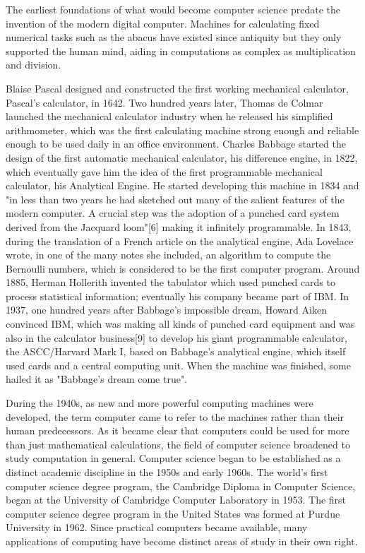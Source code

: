The earliest foundations of what would become computer science predate the invention of the modern digital computer. Machines for calculating fixed numerical tasks such as the abacus have existed since antiquity but they only supported the human mind, aiding in computations as complex as multiplication and division.

Blaise Pascal designed and constructed the first working mechanical calculator, Pascal's calculator, in 1642. Two hundred years later, Thomas de Colmar launched the mechanical calculator industry when he released his simplified arithmometer, which was the first calculating machine strong enough and reliable enough to be used daily in an office environment. Charles Babbage started the design of the first automatic mechanical calculator, his difference engine, in 1822, which eventually gave him the idea of the first programmable mechanical calculator, his Analytical Engine. He started developing this machine in 1834 and "in less than two years he had sketched out many of the salient features of the modern computer. A crucial step was the adoption of a punched card system derived from the Jacquard loom"[6] making it infinitely programmable. In 1843, during the translation of a French article on the analytical engine, Ada Lovelace wrote, in one of the many notes she included, an algorithm to compute the Bernoulli numbers, which is considered to be the first computer program. Around 1885, Herman Hollerith invented the tabulator which used punched cards to process statistical information; eventually his company became part of IBM. In 1937, one hundred years after Babbage's impossible dream, Howard Aiken convinced IBM, which was making all kinds of punched card equipment and was also in the calculator business[9] to develop his giant programmable calculator, the ASCC/Harvard Mark I, based on Babbage's analytical engine, which itself used cards and a central computing unit. When the machine was finished, some hailed it as "Babbage's dream come true".

During the 1940s, as new and more powerful computing machines were developed, the term computer came to refer to the machines rather than their human predecessors. As it became clear that computers could be used for more than just mathematical calculations, the field of computer science broadened to study computation in general. Computer science began to be established as a distinct academic discipline in the 1950s and early 1960s. The world's first computer science degree program, the Cambridge Diploma in Computer Science, began at the University of Cambridge Computer Laboratory in 1953. The first computer science degree program in the United States was formed at Purdue University in 1962. Since practical computers became available, many applications of computing have become distinct areas of study in their own right.

